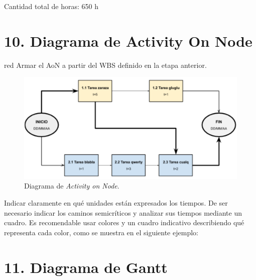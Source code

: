 \documentclass[
11pt, %
]{charter}
\begin{document}
Cantidad total de horas: 650 h

\section{10. Diagrama de Activity On Node}
\label{sec:AoN}

\begin{consigna}{red}
Armar el AoN a partir del WBS definido en la etapa anterior. 



\end{consigna}

\begin{figure}[htpb]
\centering 
\includegraphics[width=.8\textwidth]{./Figuras/AoN.png}
\caption{Diagrama de \textit{Activity on Node}.}
\label{fig:AoN}
\end{figure}

Indicar claramente en qué unidades están expresados los tiempos.
De ser necesario indicar los caminos semicríticos y analizar sus tiempos mediante un cuadro.
Es recomendable usar colores y un cuadro indicativo describiendo qué representa cada color, como se muestra en el siguiente ejemplo:



\section{11. Diagrama de Gantt}
\label{sec:gantt}
\end{document}
